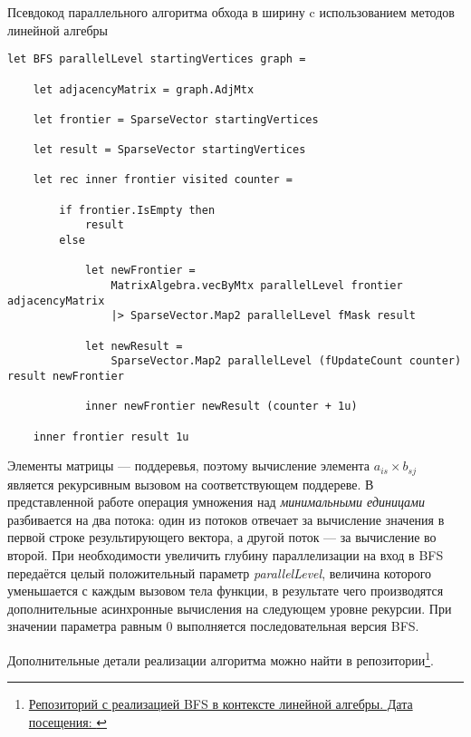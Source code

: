 \begin{algorithm}[h]
\caption{Псевдокод параллельного алгоритма обхода в ширину c использованием методов линейной алгебры}
\label{alg:bfs_example}
\begin{lstlisting}[language=pseudoFSharp]
let BFS parallelLevel startingVertices graph =

	let adjacencyMatrix = graph.AdjMtx

    let frontier = SparseVector startingVertices

    let result = SparseVector startingVertices

    let rec inner frontier visited counter =

        if frontier.IsEmpty then
            result
        else

            let newFrontier =
                MatrixAlgebra.vecByMtx parallelLevel frontier adjacencyMatrix
                |> SparseVector.Map2 parallelLevel fMask result

            let newResult =
                SparseVector.Map2 parallelLevel (fUpdateCount counter) result newFrontier

            inner newFrontier newResult (counter + 1u)

    inner frontier result 1u
\end{lstlisting}
\end{algorithm}


Элементы матрицы --- поддеревья, поэтому вычисление элемента $a_{is} \times b_{sj}$ является рекурсивным вызовом на соответствующем поддереве. В представленной работе операция умножения над \textit{минимальными единицами} разбивается на два потока: один из потоков отвечает за вычисление значения в первой строке результирующего вектора, а другой поток --- за вычисление во второй. При необходимости увеличить глубину параллелизации на вход в BFS передаётся целый положительный параметр \textit{parallelLevel}, величина которого уменьшается с каждым вызовом тела функции, в результате чего производятся дополнительные асинхронные вычисления на следующем уровне рекурсии. При значении параметра равным 0 выполняется последовательная версия BFS.


\noindent Дополнительные детали реализации алгоритма можно найти в репозитории\footnote{\href{https://github.com/artem-burashnikov}{Репозиторий с реализацией BFS в контексте линейной алгебры. Дата посещения: }}.
